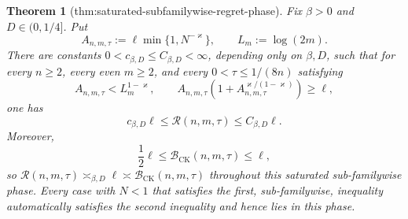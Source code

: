 \documentclass{article}
\newtheorem{theorem}{Theorem}
\begin{document}
\begin{theorem}[thm:saturated-subfamilywise-regret-phase]\label{thm:saturated-subfamilywise-regret-phase}
Fix \(\beta>0\) and \(D\in(0,1/4]\). Put
\[
A_{n,m,\tau}:=\ell\min\{1,N^{-\varkappa}\},
\qquad L_m:=\log(2m).
\]
There are constants \(0<c_{\beta,D}\le C_{\beta,D}<\infty\), depending only on \(\beta,D\), such that for every \(n\ge2\), every even \(m\ge2\), and every \(0<\tau\le1/(8n)\) satisfying
\[
A_{n,m,\tau}<L_m^{1-\varkappa},
\qquad
A_{n,m,\tau}\left(1+A_{n,m,\tau}^{\varkappa/(1-\varkappa)}\right)\ge\ell,
\]
one has
\[
c_{\beta,D}\ell
\le \mathcal R(n,m,\tau)
\le C_{\beta,D}\ell.
\]
Moreover,
\[
\frac12\ell\le \mathcal B_{\mathrm{CK}}(n,m,\tau)\le\ell,
\]
so \(\mathcal R(n,m,\tau)\asymp_{\beta,D}\ell\asymp\mathcal B_{\mathrm{CK}}(n,m,\tau)\) throughout this saturated sub-familywise phase. Every case with \(N<1\) that satisfies the first, sub-familywise, inequality automatically satisfies the second inequality and hence lies in this phase.
\end{theorem}
\end{document}
